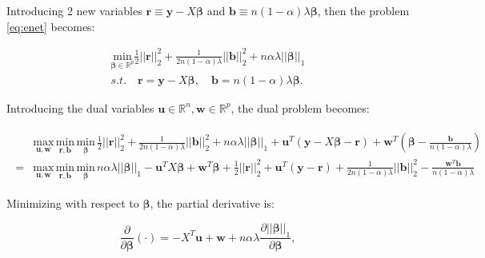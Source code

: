 Introducing 2 new variables $\boldsymbol r\equiv \boldsymbol y-X\boldsymbol\beta$ and $\boldsymbol b\equiv n(1-\alpha)\lambda \boldsymbol\beta$, then the problem \eqref{eq:enet} becomes:

\begin{equation}
    \label{eq:dual+rb}
    \begin{gathered}
    \underset{\boldsymbol\beta\in \mathbb{R}^p}{\mathrm{min}}\frac{1}{2}||\boldsymbol r||_2^2+\frac{1}{2n(1-\alpha)\lambda}||\boldsymbol b||_2^2+n\alpha\lambda||\boldsymbol\beta||_1\\s.t.\quad \boldsymbol r=\boldsymbol y-X\boldsymbol\beta,\quad \boldsymbol b=n(1-\alpha)\lambda \boldsymbol\beta.
\end{gathered}
\end{equation}

Introducing the dual variables $\boldsymbol u\in\mathbb{R}^{n},\boldsymbol w\in\mathbb{R}^p$, the dual problem becomes:

\begin{gather}
    \label{eq:dual+uw}
    \begin{aligned}
        &\underset{\boldsymbol u,\boldsymbol w}{\mathrm{max}}\,\underset{\boldsymbol r,\boldsymbol b}{\mathrm{min}}\,\underset{\boldsymbol\beta}{\mathrm{min}}\,\frac{1}{2}||\boldsymbol r||_2^2+\frac{1}{2n(1-\alpha)\lambda}||\boldsymbol b||_2^2+n\alpha\lambda||\boldsymbol\beta||_1+\boldsymbol u^T(\boldsymbol y-X\boldsymbol\beta-\boldsymbol r)+\boldsymbol w^T\left(\boldsymbol\beta-\frac{\boldsymbol b}{n(1-\alpha)\lambda}\right)\\
        =&\underset{\boldsymbol u,\boldsymbol w}{\mathrm{max}}\,\underset{\boldsymbol r,\boldsymbol b}{\mathrm{min}}\,\underset{\boldsymbol\beta}{\mathrm{min}}\,n\alpha\lambda||\boldsymbol\beta||_1-\boldsymbol u^TX\boldsymbol\beta+\boldsymbol w^T\boldsymbol\beta+\frac{1}{2}||\boldsymbol r||_2^2+\boldsymbol u^T(\boldsymbol y-\boldsymbol r)+\frac{1}{2n(1-\alpha)\lambda}||\boldsymbol b||_2^2-\frac{\boldsymbol w^T\boldsymbol b}{n(1-\alpha)\lambda}
    \end{aligned}    
\end{gather}


Minimizing with respect to $\boldsymbol\beta$, the partial derivative is:

\begin{equation}
    \label{eq:partialbeta}
    \frac{\partial}{\partial\boldsymbol\beta}(\cdot) =-X^T\boldsymbol u+\boldsymbol w+n\alpha\lambda\frac{\partial||\boldsymbol\beta||_1}{\partial\boldsymbol\beta},
\end{equation}

